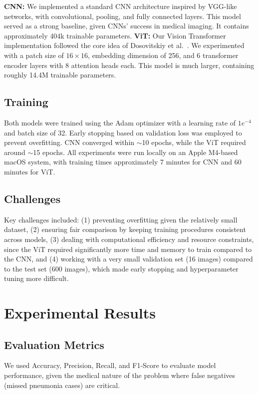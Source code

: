 \documentclass{article}
\begin{document}
\textbf{CNN:} We implemented a standard CNN architecture inspired by VGG-like networks, with convolutional, pooling, and fully connected layers. This model served as a strong baseline, given CNNs' success in medical imaging. It contains approximately 404k trainable parameters.
\textbf{ViT:} Our Vision Transformer implementation followed the core idea of Dosovitskiy et al.~\cite{dosovitskiy2020image}. We experimented with a patch size of $16 \times 16$, embedding dimension of 256, and 6 transformer encoder layers with 8 attention heads each. This model is much larger, containing roughly 14.4M trainable parameters.

\subsection{Training}
Both models were trained using the Adam optimizer with a learning rate of $1e^{-4}$ and batch size of 32. Early stopping based on validation loss was employed to prevent overfitting. CNN converged within $\sim$10 epochs, while the ViT required around $\sim$15 epochs. All experiments were run locally on an Apple M4-based macOS system, with training times approximately 7 minutes for CNN and 60 minutes for ViT.

\subsection{Challenges}
Key challenges included: 
(1) preventing overfitting given the relatively small dataset, 
(2) ensuring fair comparison by keeping training procedures consistent across models, 
(3) dealing with computational efficiency and resource constraints, since the ViT required significantly more time and memory to train compared to the CNN, and
(4) working with a very small validation set (16 images) compared to the test set (600 images), which made early stopping and hyperparameter tuning more difficult.

\section{Experimental Results}

\subsection{Evaluation Metrics}
We used Accuracy, Precision, Recall, and F1-Score to evaluate model performance, given the medical nature of the problem where false negatives (missed pneumonia cases) are critical.
\end{document}
